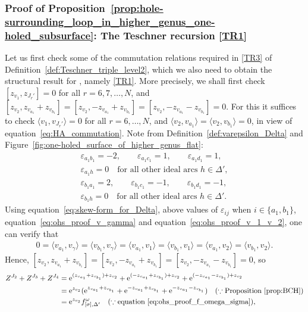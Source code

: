 \documentclass[pdftex]{sigma}
\numberwithin{equation}{section}
\theoremstyle{definition}
\begin{document}
\subsubsection{Proof of Proposition~\ref{prop:hole-surrounding_loop_in_higher_genus_one-holed_subsurface}: The Teschner recursion \ref{TR1}}
Let us first check some of the commutation relations required in \ref{TR3} of Definition~\ref{def:Teschner_triple_level2}, which we also need to obtain the structural result for , namely \ref{TR1}. More precisely, we shall first check $[z_{v_1}, z_{J_r'}]=0$ for all $r=6,7,\dots,N$, and $[z_{v_2}, z_{v_{a_1}}+ z_{v_{b_1}}] = [z_{v_2}, -z_{v_{a_1}} + z_{v_{b_1}}] = [z_{v_2}, - z_{v_{a_1}}- z_{v_{b_1}}]=0$. For this it suffices to check $\langle v_1,v_{J_r'}\rangle=0$ for all $r=6,\dots,N$, and $\langle v_2, v_{a_1} \rangle = \langle v_2, v_{b_1}\rangle=0$, in view of equation~\eqref{eq:HA_commutation}. Note from Definition~\ref{def:varepsilon_Delta} and Figure~\ref{fig:one-holed_surface_of_higher_genus_flat}:
\begin{gather}
\varepsilon_{a_1 b_1} = - 2, \qquad
\varepsilon_{a_1 c_1} = 1, \qquad
\varepsilon_{a_1 d_1} = 1, \nonumber\\
\varepsilon_{a_1 h} = 0 \quad \mbox{for all other ideal arcs $h \in \Delta'$}, \label{eq:ohs_proof_some_varepsilon1}\\
\varepsilon_{b_1 a_1} = 2, \qquad
\varepsilon_{b_1 c_1} = -1, \qquad
\varepsilon_{b_1 d_1} = -1, \nonumber\\
\varepsilon_{b_1 h} =0 \quad \mbox{for all other ideal arcs $h\in \Delta'$}.\label{eq:ohs_proof_some_varepsilon2}
\end{gather}
Using equation~\eqref{eq:skew-form_for_Delta}, above values of $\varepsilon_{ij}$ when $i\in \{a_1,b_1\}$, equation~\eqref{eq:ohs_proof_v_gamma} and equation~\eqref{eq:ohs_proof_v_1_v_2}, one can verify that
\begin{align}
\label{eq:ohs_proof_some_commutations1}
0 = \langle v_{a_1}, v_\gamma \rangle
= \langle v_{b_1}, v_\gamma \rangle
= \langle v_{a_1}, v_1\rangle
= \langle v_{b_1}, v_1\rangle
= \langle v_{a_1}, v_2 \rangle
= \langle v_{b_1}, v_2 \rangle.
\end{align}
Hence, $[z_{v_2}, z_{v_{a_1}}+ z_{v_{b_1}}] = [z_{v_2}, -z_{v_{a_1}} + z_{v_{b_1}}] = [z_{v_2}, - z_{v_{a_1}}- z_{v_{b_1}}]=0$, so
\begin{align*}
Z^{J_2} + Z^{J_3} + Z^{J_4}
& = {\rm e}^{(z_{v_{a_1}} + z_{v_{b_1}}) + z_{v_2}}
+ {\rm e}^{(-z_{v_{a_1}} + z_{v_{b_1}}) + z_{v_2}}
+ {\rm e}^{(-z_{v_{a_1}} - z_{v_{b_1}}) + z_{v_2}} \\
& = {\rm e}^{z_{v_2}}( {\rm e}^{z_{v_{a_1}} + z_{v_{b_1}}}
+ {\rm e}^{-z_{v_{a_1}} + z_{v_{b_1}}}
+ {\rm e}^{-z_{v_{a_1}} - z_{v_{b_1}}}) \quad (\because \mbox{Proposition~\ref{prop:BCH}}) \\
& = {\rm e}^{z_{v_2}} f^\omega_{[\sigma],\Delta'} \quad (\because \mbox{equation~\eqref{eq:ohs_proof_f_omega_sigma}}),
\end{align*}
\end{document}
